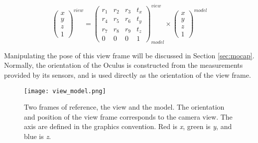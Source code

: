 \[
\begin{pmatrix} x \\ y \\ z \\ 1 \end{pmatrix}^{view} = 
    \begin{pmatrix}
        r_{1} & r_{2} & r_{3} & t_{x} \\
        r_{4} & r_{5} & r_{6} & t_{y} \\
        r_{7} & r_{8} & r_{9} & t_{z} \\
        0 & 0 & 0 & 1
    \end{pmatrix}^{view}_{model}
    \times
\begin{pmatrix} x \\ y \\ z \\ 1 \end{pmatrix}^{model}
\]



Manipulating the pose of this view frame will be discussed in Section
\ref{sec:mocap}. Normally, the orientation of the Oculus is constructed from
the measurements provided by its sensors, and is used directly as the
orientation of the view frame.

\begin{figure}[]
\centering
\texttt{[image: view\_model.png]}
\caption{Two frames of reference, the view and the model. The orientation and
position of the view frame corresponds to the camera view. The axis are
defined in the graphics convention. Red is \emph{x}, green is \emph{y}, 
and blue is \emph{z}.}
\label{fig:worldview}
\end{figure}

